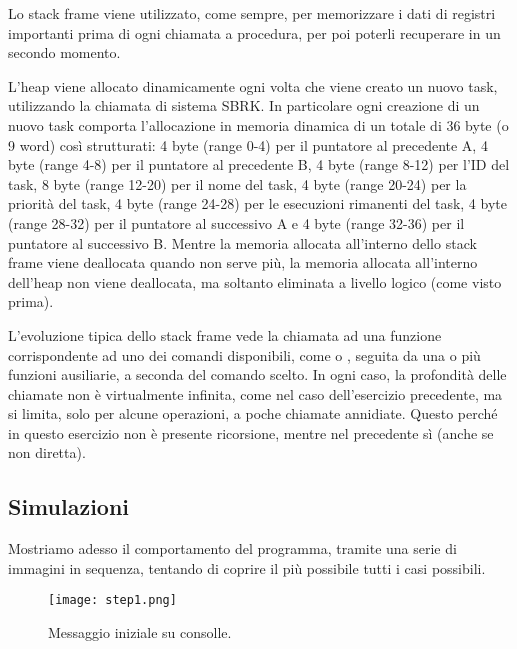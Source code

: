         Lo stack frame viene utilizzato, come sempre, per memorizzare i dati di registri importanti prima di ogni chiamata a procedura, per poi poterli recuperare in un secondo momento.
        
        L'heap viene allocato dinamicamente ogni volta che viene creato un nuovo task, utilizzando la chiamata di sistema SBRK. In particolare ogni creazione di un nuovo task comporta l'allocazione in memoria dinamica di un totale di 36 byte (o 9 word) così strutturati: 4 byte (range 0-4) per il puntatore al precedente A, 4 byte (range 4-8) per il puntatore al precedente B, 4 byte (range 8-12) per l'ID del task, 8 byte (range 12-20) per il nome del task, 4 byte (range 20-24) per la priorità del task, 4 byte (range 24-28) per le esecuzioni rimanenti del task, 4 byte (range 28-32) per il puntatore al successivo A e 4 byte (range 32-36) per il puntatore al successivo B. Mentre la memoria allocata all'interno dello stack frame viene deallocata quando non serve più, la memoria allocata all'interno dell'heap non viene deallocata, ma soltanto eliminata a livello logico (come visto prima).
        
        L'evoluzione tipica dello stack frame vede la chiamata ad una funzione corrispondente ad uno dei comandi disponibili, come  o , seguita da una o più funzioni ausiliarie, a seconda del comando scelto. In ogni caso, la profondità delle chiamate non è virtualmente infinita, come nel caso dell'esercizio precedente, ma si limita, solo per alcune operazioni, a poche chiamate annidiate. Questo perché in questo esercizio non è presente ricorsione, mentre nel precedente sì (anche se non diretta).
    
    \subsection*{Simulazioni}
    
        Mostriamo adesso il comportamento del programma, tramite una serie di immagini in sequenza, tentando di coprire il più possibile tutti i casi possibili.
        
       	\begin{figure}[h!]
       		\begin{center}
       			\texttt{[image: step1.png]}
       		\end{center}
       		\caption{Messaggio iniziale su consolle.}
       		\label{fig:step1}
       	\end{figure}
       	
